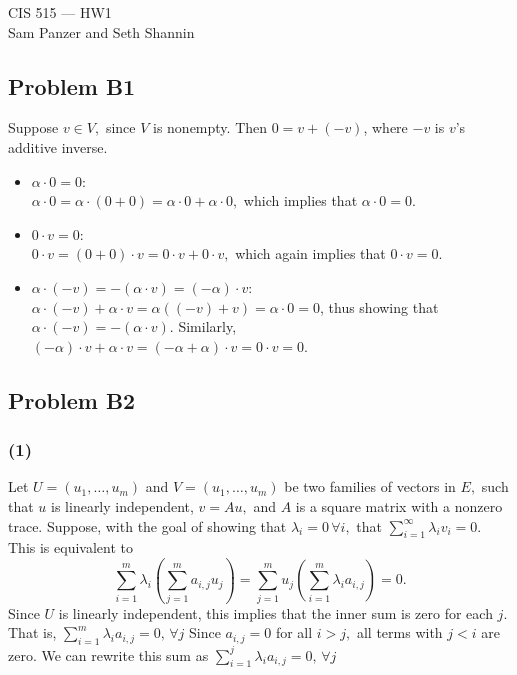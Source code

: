 \documentclass{article}
\begin{document}
\begin{center}CIS 515 --- HW1\\Sam Panzer and Seth Shannin\end{center}
\subsection{Problem B1}
  Suppose $v \in V,$ since $V$ is nonempty. Then $0 = v + (-v)$, where $-v$ is $v$'s additive inverse.
\begin{itemize}
  \item $\alpha \cdot 0 = 0$:\\
    $\alpha\cdot 0 = \alpha\cdot(0 + 0) = \alpha\cdot 0 + \alpha\cdot 0,$ which
    implies that $\alpha\cdot 0 = 0.$
  \item $0\cdot v = 0$: \\
    $0 \cdot v = (0 + 0)\cdot v = 0 \cdot v + 0 \cdot v,$ which again implies
    that $0 \cdot v = 0.$
  \item $\alpha \cdot (-v) = -(\alpha \cdot v) = (-\alpha) \cdot v$:\\
  $\alpha \cdot (-v) + \alpha \cdot v = \alpha ((-v) + v) = \alpha \cdot 0 = 0$,
  thus showing that $\alpha \cdot (-v) =  -(\alpha \cdot v).$ Similarly,
  $(-\alpha) \cdot v + \alpha \cdot v = (-\alpha + \alpha)\cdot v =
  0 \cdot v = 0$.
  \end{itemize}

\subsection{Problem B2}
\subsubsection{(1)}
Let $U = (u_1,\dots,u_m)$ and $V = (u_1,\dots,u_m)$ be two families of
vectors in $E,$ such that $u$ is linearly independent, $v = Au,$ and $A$
is a square matrix with a nonzero trace.
Suppose, with the goal of showing that $\lambda_i = 0\, \forall i,$ that 
$\displaystyle{\sum_{i=1}^\infty \lambda_i v_i = 0}.$ This is equivalent to
\[ \sum_{i=1}^m\lambda_i\left( \sum_{j=1}^m a_{i,j}u_j \right) = 
   \sum_{j=1}^m u_j\left( \sum_{i=1}^m \lambda_i a_{i,j} \right) = 0.
\]
Since $U$ is linearly independent, this implies that the inner sum is zero for
each $j.$ That is,
$\displaystyle{ \sum_{i=1}^m \lambda_i a_{i,j} = 0, \,\forall j }$
Since $a_{i,j} = 0$ for all $i > j,$ all terms with $j < i$ are zero. We can
rewrite this sum as
$\displaystyle{ \sum_{i=1}^j \lambda_i a_{i,j} = 0, \,\forall j }$
\end{document}
